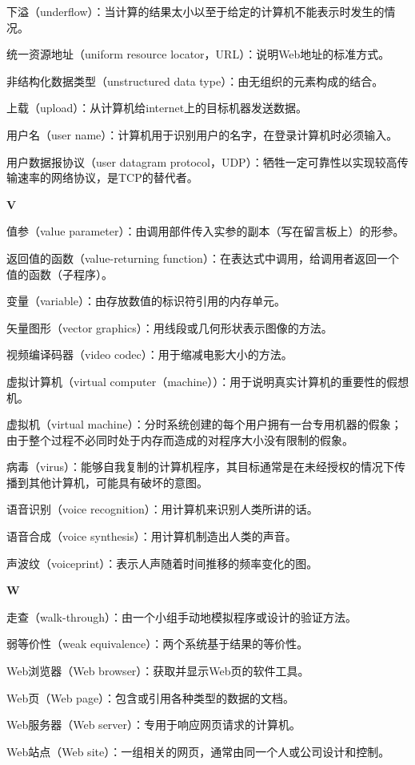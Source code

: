 下溢（underflow）：当计算的结果太小以至于给定的计算机不能表示时发生的情况。

统一资源地址（uniform resource locator，URL）：说明Web地址的标准方式。

非结构化数据类型（unstructured data type）：由无组织的元素构成的结合。

上载（upload）：从计算机给internet上的目标机器发送数据。

用户名（user name）：计算机用于识别用户的名字，在登录计算机时必须输入。

用户数据报协议（user datagram protocol，UDP）：牺牲一定可靠性以实现较高传输速率的网络协议，是TCP的替代者。

\textbf{V}

值参（value parameter）：由调用部件传入实参的副本（写在留言板上）的形参。

返回值的函数（value-returning function）：在表达式中调用，给调用者返回一个值的函数（子程序）。

变量（variable）：由存放数值的标识符引用的内存单元。

矢量图形（vector graphics）：用线段或几何形状表示图像的方法。

视频编译码器（video codec）：用于缩减电影大小的方法。

虚拟计算机（virtual computer（machine））：用于说明真实计算机的重要性的假想机。

虚拟机（virtual machine）：分时系统创建的每个用户拥有一台专用机器的假象；由于整个过程不必同时处于内存而造成的对程序大小没有限制的假象。

病毒（virus）：能够自我复制的计算机程序，其目标通常是在未经授权的情况下传播到其他计算机，可能具有破坏的意图。

语音识别（voice recognition）：用计算机来识别人类所讲的话。

语音合成（voice synthesis）：用计算机制造出人类的声音。

声波纹（voiceprint）：表示人声随着时间推移的频率变化的图。

\textbf{W}

走查（walk-through）：由一个小组手动地模拟程序或设计的验证方法。

弱等价性（weak equivalence）：两个系统基于结果的等价性。

Web浏览器（Web browser）：获取并显示Web页的软件工具。

Web页（Web page）：包含或引用各种类型的数据的文档。

Web服务器（Web server）：专用于响应网页请求的计算机。

Web站点（Web site）：一组相关的网页，通常由同一个人或公司设计和控制。

